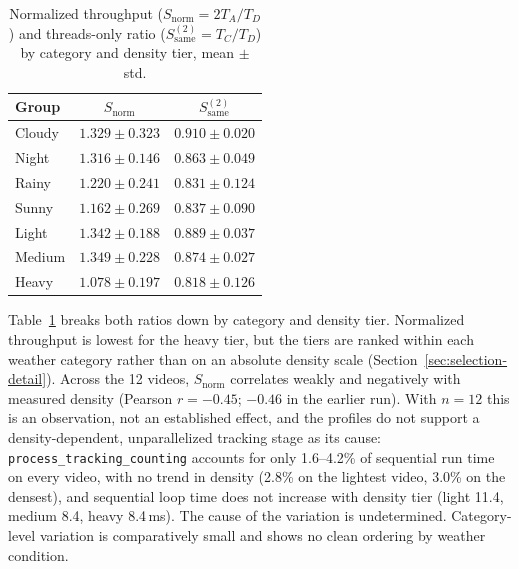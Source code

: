 \documentclass[conference]{IEEEtran}
\newcommand{\code}[1]{\texttt{#1}}
\begin{document}
\begin{table}[t]
\centering
\caption{Normalized throughput ($S_{\text{norm}}=2T_A/T_D$) and
threads-only ratio ($S_{\text{same}}^{(2)}=T_C/T_D$) by category and
density tier, mean $\pm$ std.}
\label{tab:speedup-breakdown}
\footnotesize
\begin{tabular}{lcc}
\toprule
\textbf{Group} & $S_{\text{norm}}$ & $S_{\text{same}}^{(2)}$ \\
\midrule
Cloudy & $1.329 \pm 0.323$ & $0.910 \pm 0.020$ \\
Night  & $1.316 \pm 0.146$ & $0.863 \pm 0.049$ \\
Rainy  & $1.220 \pm 0.241$ & $0.831 \pm 0.124$ \\
Sunny  & $1.162 \pm 0.269$ & $0.837 \pm 0.090$ \\
\midrule
Light  & $1.342 \pm 0.188$ & $0.889 \pm 0.037$ \\
Medium & $1.349 \pm 0.228$ & $0.874 \pm 0.027$ \\
Heavy  & $1.078 \pm 0.197$ & $0.818 \pm 0.126$ \\
\bottomrule
\end{tabular}
\end{table}

Table~\ref{tab:speedup-breakdown} breaks both ratios down by category and
density tier. Normalized throughput is lowest for the heavy tier, but the
tiers are ranked within each weather category rather than on an
absolute density scale (Section~\ref{sec:selection-detail}). Across the
12 videos, $S_{\text{norm}}$ correlates weakly and negatively with
measured density (Pearson $r=-0.45$; $-0.46$ in the earlier run). With
$n=12$ this is an observation, not an established effect, and the
profiles do not support a density-dependent, unparallelized tracking
stage as its cause: \code{process\_tracking\_counting} accounts for only
1.6--4.2\% of sequential run time on every video, with no trend in
density (2.8\% on the lightest video, 3.0\% on the densest), and
sequential loop time does not increase with density tier (light 11.4,
medium 8.4, heavy 8.4\,ms). The cause of the variation is undetermined.
Category-level variation is comparatively small and shows no clean
ordering by weather condition.
\end{document}
